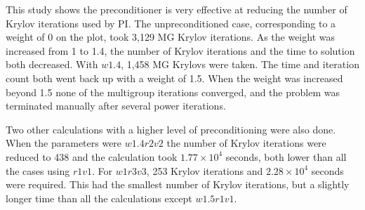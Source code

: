 \documentclass[preprint,12pt]{elsarticle}
\begin{document}
This study shows the preconditioner is very effective at reducing the number of Krylov iterations used by PI. The unpreconditioned case, corresponding to a weight of 0 on the plot, took 3,129 MG Krylov iterations. As the weight was increased from 1 to 1.4, the number of Krylov iterations and the time to solution both decreased. With $w1.4$, 1,458 MG Krylovs were taken. The time and iteration count both went back up with a weight of 1.5. When the weight was increased beyond 1.5 none of the multigroup iterations converged, and the problem was terminated manually after several power iterations. 

Two other calculations with a higher level of preconditioning were also done. When the parameters were $w1.4r2v2$ the number of Krylov iterations were reduced to 438 and the calculation took $1.77 \times 10^{4}$ seconds, both lower than all the cases using $r1v1$. For $w1r3v3$, 253 Krylov iterations and $2.28 \times 10^{4}$ seconds were required. This had the smallest number of Krylov iterations, but a slightly longer time than all the calculations except $w1.5r1v1$.	
\end{document}
